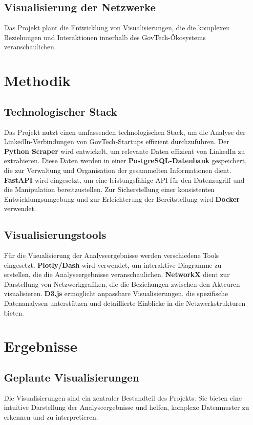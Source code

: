 \documentclass[a4paper,12pt]{article}
\begin{document}
\subsection*{Visualisierung der Netzwerke}
Das Projekt plant die Entwicklung von Visualisierungen, die die komplexen Beziehungen und Interaktionen innerhalb des GovTech-Ökosystems veranschaulichen.

\section{Methodik}
\subsection*{Technologischer Stack}
Das Projekt nutzt einen umfassenden technologischen Stack, um die Analyse der LinkedIn-Verbindungen von GovTech-Startups effizient durchzuführen. Der \textbf{Python Scraper} wird entwickelt, um relevante Daten effizient von LinkedIn zu extrahieren. Diese Daten werden in einer \textbf{PostgreSQL-Datenbank} gespeichert, die zur Verwaltung und Organisation der gesammelten Informationen dient. \textbf{FastAPI} wird eingesetzt, um eine leistungsfähige API für den Datenzugriff und die Manipulation bereitzustellen. Zur Sicherstellung einer konsistenten Entwicklungsumgebung und zur Erleichterung der Bereitstellung wird \textbf{Docker} verwendet.

\subsection*{Visualisierungstools}
Für die Visualisierung der Analyseergebnisse werden verschiedene Tools eingesetzt. \textbf{Plotly/Dash} wird verwendet, um interaktive Diagramme zu erstellen, die die Analyseergebnisse veranschaulichen. \textbf{NetworkX} dient zur Darstellung von Netzwerkgrafiken, die die Beziehungen zwischen den Akteuren visualisieren. \textbf{D3.js} ermöglicht anpassbare Visualisierungen, die spezifische Datenanalysen unterstützen und detaillierte Einblicke in die Netzwerkstrukturen bieten.

\section{Ergebnisse}
\subsection*{Geplante Visualisierungen}
Die Visualisierungen sind ein zentraler Bestandteil des Projekts. Sie bieten eine intuitive Darstellung der Analyseergebnisse und helfen, komplexe Datenmuster zu erkennen und zu interpretieren.
\end{document}
